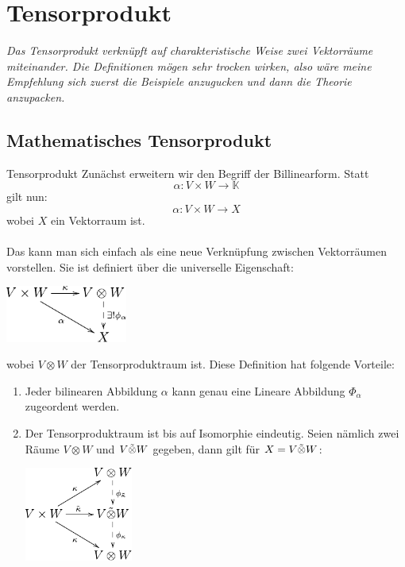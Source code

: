 \newpage
\section[Einführung in die Tensorprodukte]{Tensorprodukt}
\textit{Das Tensorprodukt verknüpft auf charakteristische Weise zwei Vektorräume miteinander. Die Definitionen mögen sehr trocken wirken, also wäre meine Empfehlung sich zuerst die Beispiele anzugucken und dann die Theorie anzupacken.}
\subsection{Mathematisches Tensorprodukt}
\begin{Def}{Tensorprodukt}
    Zunächst erweitern wir den Begriff der Billinearform. Statt
    $$\alpha: V\times W \rightarrow \mathbb{K}$$
    gilt nun:
    $$\alpha: V\times W \rightarrow X$$
    wobei $X$ ein Vektorraum ist. \\ \\
    Das  kann man sich einfach als eine neue Verknüpfung zwischen Vektorräumen vorstellen. Sie ist definiert über die universelle Eigenschaft:
    \begin{center}
    \includegraphics[width=0.3\textwidth]{Dateien/Tensor1.pdf}
\end{center}
wobei $V\otimes W$ der Tensorproduktraum ist. Diese Definition hat folgende Vorteile: \\
\begin{enumerate}
    \item Jeder bilinearen Abbildung $\alpha$ kann genau eine Lineare Abbildung $\Phi_\alpha$ zugeordent werden.
    \item Der Tensorproduktraum ist bis auf Isomorphie eindeutig. Seien nämlich zwei Räume $V\otimes W$ und $V\Tilde{\otimes}W$ gegeben, dann gilt für $X=V\Tilde{\otimes}W$:
\begin{center}
    \includegraphics[width=0.28\textwidth]{Dateien/Tensor2.pdf}

\end{center}
\end{enumerate}
\end{Def}
